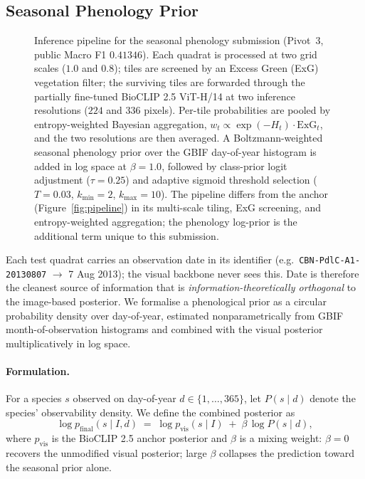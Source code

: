 \documentclass[sigconf]{ceurart}
\begin{document}
\subsection{Seasonal Phenology Prior}
\label{sec:phenology}

\begin{figure}[!htbp]
  \centering
  \resizebox{0.82\linewidth}{!}{}
  \caption{Inference pipeline for the seasonal phenology submission (Pivot~3, public Macro F1 $0.41346$). Each quadrat is processed at two grid scales ($1.0$ and $0.8$); tiles are screened by an Excess Green (ExG) vegetation filter; the surviving tiles are forwarded through the partially fine-tuned BioCLIP 2.5 ViT-H/14 at two inference resolutions ($224$ and $336$ pixels). Per-tile probabilities are pooled by entropy-weighted Bayesian aggregation, $w_t \propto \exp(-H_t)\cdot\mathrm{ExG}_t$, and the two resolutions are then averaged. A Boltzmann-weighted seasonal phenology prior over the GBIF day-of-year histogram is added in log space at $\beta{=}1.0$, followed by class-prior logit adjustment ($\tau{=}0.25$) and adaptive sigmoid threshold selection ($T{=}0.03$, $k_{\min}{=}2$, $k_{\max}{=}10$). The pipeline differs from the anchor (Figure~\ref{fig:pipeline}) in its multi-scale tiling, ExG screening, and entropy-weighted aggregation; the phenology log-prior is the additional term unique to this submission.}
  \label{fig:phenology_pipeline}
\end{figure}

Each test quadrat carries an observation date in its identifier (e.g.\ \texttt{CBN-PdlC-A1-20130807} $\to$ 7 Aug 2013); the visual backbone never sees this. Date is therefore the cleanest source of information that is \emph{information-theoretically orthogonal} to the image-based posterior. We formalise a phenological prior as a circular probability density over day-of-year, estimated nonparametrically from GBIF month-of-observation histograms and combined with the visual posterior multiplicatively in log space.
\paragraph{Formulation.} For a species $s$ observed on day-of-year $d \in \{1,\ldots,365\}$, let $P(s \mid d)$ denote the species' observability density. We define the combined posterior as
\begin{equation}
    \log p_{\text{final}}(s \mid I, d) \;=\; \log p_{\text{vis}}(s \mid I) \;+\; \beta \,\log P(s \mid d),
\end{equation}
where $p_{\text{vis}}$ is the BioCLIP 2.5 anchor posterior and $\beta$ is a mixing weight: $\beta{=}0$ recovers the unmodified visual posterior; large $\beta$ collapses the prediction toward the seasonal prior alone.
\end{document}
